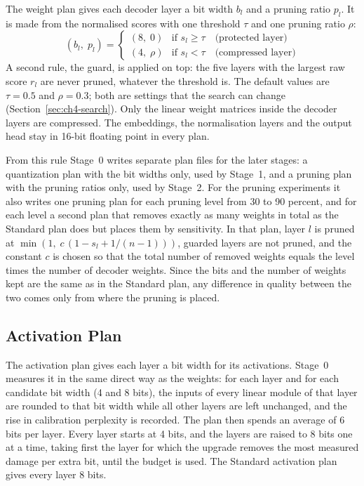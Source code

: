 The weight plan gives each decoder layer a bit width $b_l$ and a pruning ratio $p_l$. It is made from the normalised scores with one threshold $\tau$ and one pruning ratio $\rho$:
\begin{equation}
  (b_l,\; p_l) = \left\{
  \begin{array}{ll}
    (8,\; 0) & \text{if } s_l \geq \tau \quad \text{(protected layer)} \\
    (4,\; \rho) & \text{if } s_l < \tau \quad \text{(compressed layer)}
  \end{array}
  \right.
  \label{eq:ch4-plan}
\end{equation}
A second rule, the guard, is applied on top: the five layers with the largest raw score $r_l$ are never pruned, whatever the threshold is. The default values are $\tau = 0.5$ and $\rho = 0.3$; both are settings that the search can change (Section~\ref{sec:ch4-search}). Only the linear weight matrices inside the decoder layers are compressed. The embeddings, the normalisation layers and the output head stay in 16-bit floating point in every plan.

From this rule Stage~0 writes separate plan files for the later stages: a quantization plan with the bit widths only, used by Stage~1, and a pruning plan with the pruning ratios only, used by Stage~2. For the pruning experiments it also writes one pruning plan for each pruning level from 30 to 90 percent, and for each level a second plan that removes exactly as many weights in total as the Standard plan does but places them by sensitivity. In that plan, layer $l$ is pruned at $\min(1,\; c\,(1 - s_l + 1/(n-1)))$, guarded layers are not pruned, and the constant $c$ is chosen so that the total number of removed weights equals the level times the number of decoder weights. Since the bits and the number of weights kept are the same as in the Standard plan, any difference in quality between the two comes only from where the pruning is placed.

\subsection{Activation Plan}
\label{sec:ch4-actplan}

The activation plan gives each layer a bit width for its activations. Stage~0 measures it in the same direct way as the weights: for each layer and for each candidate bit width (4 and 8 bits), the inputs of every linear module of that layer are rounded to that bit width while all other layers are left unchanged, and the rise in calibration perplexity is recorded. The plan then spends an average of 6 bits per layer. Every layer starts at 4 bits, and the layers are raised to 8 bits one at a time, taking first the layer for which the upgrade removes the most measured damage per extra bit, until the budget is used. The Standard activation plan gives every layer 8 bits.

